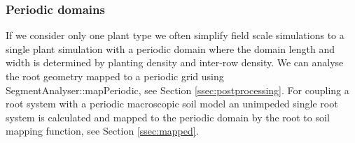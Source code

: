 \subsubsection*{Periodic domains}

If we consider only one plant type we often simplify field scale simulations to a single plant simulation with a periodic domain where the domain length and width is determined by planting density and inter-row density. We can analyse the root geometry mapped to a periodic grid using SegmentAnalyser::mapPeriodic, see Section \ref{ssec:postprocessing}. For coupling a root system with a periodic macroscopic soil model an unimpeded single root system is calculated and mapped to the periodic domain by the root to soil mapping function, see Section \ref{ssec:mapped}.




